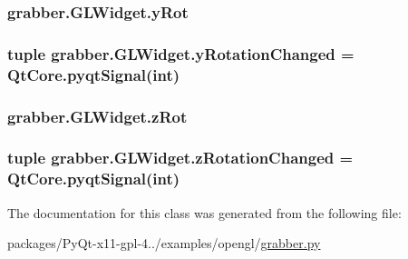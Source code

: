 \subsubsection[{y\+Rot}]{\setlength{\rightskip}{0pt plus 5cm}grabber.\+G\+L\+Widget.\+y\+Rot}\label{classgrabber_1_1GLWidget_a72497f5a94922bb55d888adcd88292b5}
\hypertarget{classgrabber_1_1GLWidget_abf434462e4dc2896dd24ad7bede6e1d0}{}
\subsubsection[{y\+Rotation\+Changed}]{\setlength{\rightskip}{0pt plus 5cm}tuple grabber.\+G\+L\+Widget.\+y\+Rotation\+Changed = Qt\+Core.\+pyqt\+Signal(int)\hspace{0.3cm}{\ttfamily [static]}}\label{classgrabber_1_1GLWidget_abf434462e4dc2896dd24ad7bede6e1d0}
\hypertarget{classgrabber_1_1GLWidget_a3b2413727ee90b43ebb1f7d69264f94e}{}
\subsubsection[{z\+Rot}]{\setlength{\rightskip}{0pt plus 5cm}grabber.\+G\+L\+Widget.\+z\+Rot}\label{classgrabber_1_1GLWidget_a3b2413727ee90b43ebb1f7d69264f94e}
\hypertarget{classgrabber_1_1GLWidget_a088516aaf3ffc3e9f19d23443f8d3a30}{}
\subsubsection[{z\+Rotation\+Changed}]{\setlength{\rightskip}{0pt plus 5cm}tuple grabber.\+G\+L\+Widget.\+z\+Rotation\+Changed = Qt\+Core.\+pyqt\+Signal(int)\hspace{0.3cm}{\ttfamily [static]}}\label{classgrabber_1_1GLWidget_a088516aaf3ffc3e9f19d23443f8d3a30}


The documentation for this class was generated from the following file\+:\begin{DoxyCompactItemize}
\item 
packages/\+Py\+Qt-\/x11-\/gpl-\/4../examples/opengl/\hyperlink{grabber_8py}{grabber.\+py}\end{DoxyCompactItemize}
